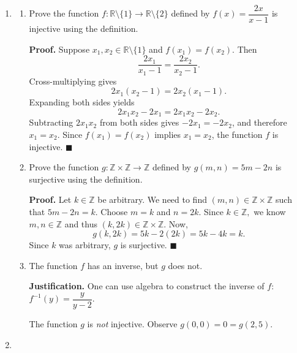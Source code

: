 \documentclass[11pt]{article}
\newcommand{\R}{{\mathbb{R}}}
\newcommand{\Z}{{\mathbb{Z}}}
\begin{document}
\thispagestyle{fancy}

\begin{enumerate}

\item %

\begin{enumerate}

\item Prove the function $f: \R\setminus\{1\} \to \R\setminus\{2\}$ defined by
$f(x)=\dfrac{2x}{x-1}$ is injective using the definition.

\medskip
\textbf{Proof.}
Suppose $x_1, x_2 \in \R\setminus\{1\}$ and $f(x_1)=f(x_2)$.
Then
\[
  \frac{2x_1}{x_1-1} = \frac{2x_2}{x_2-1}.
\]
Cross-multiplying gives
\[
  2x_1(x_2-1) = 2x_2(x_1-1).
\]
Expanding both sides yields
\[
  2x_1 x_2 - 2x_1 = 2x_1 x_2 - 2x_2.
\]
Subtracting $2x_1 x_2$ from both sides gives $-2x_1 = -2x_2$, and therefore $x_1 = x_2$.
Since $f(x_1)=f(x_2)$ implies $x_1=x_2$, the function $f$ is injective. $\blacksquare$

\medskip

\item Prove the function $g: \Z\times\Z \to \Z$ defined by $g(m,n)=5m-2n$ is surjective using the definition.

\medskip
\textbf{Proof.}
Let $k \in \Z$ be arbitrary.
We need to find $(m,n)\in\Z\times\Z$ such that $5m-2n=k$.
Choose $m=k$ and $n=2k$.
Since $k\in\Z,$ we know $m,n\in\Z$ and thus $(k,2k)\in\Z\times\Z$.
Now, 
\[
  g(k,2k) = 5k - 2(2k) = 5k - 4k = k.
\]
Since $k$ was arbitrary, $g$ is surjective. $\blacksquare$

\medskip

\item The function $f$ has an inverse, but $g$ does not.

\medskip
\textbf{Justification.}
One can use algebra to construct the inverse of $f$: $f^{-1}(y)=\dfrac{y}{y-2}$.

The function $g$ is \emph{not} injective. Observe $g(0,0)=0=g(2,5).$ 
\end{enumerate}

\item %


\end{enumerate}
\end{document}
